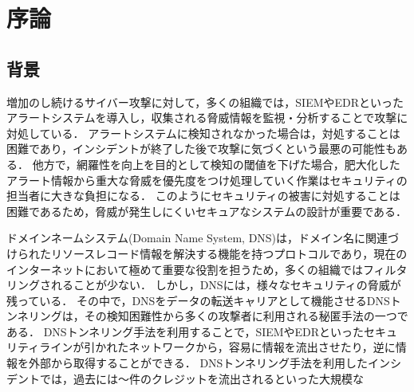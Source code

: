 \section{序論}
\subsection{背景}
増加のし続けるサイバー攻撃に対して，多くの組織では，SIEMやEDRといったアラートシステムを導入し，収集される脅威情報を監視・分析することで攻撃に対処している．
アラートシステムに検知されなかった場合は，対処することは困難であり，インシデントが終了した後で攻撃に気づくという最悪の可能性もある．
他方で，網羅性を向上を目的として検知の閾値を下げた場合，肥大化したアラート情報から重大な脅威を優先度をつけ処理していく作業はセキュリティの担当者に大きな負担になる．
このようにセキュリティの被害に対処することは困難であるため，脅威が発生しにくいセキュアなシステムの設計が重要である．

ドメインネームシステム(Domain Name System, DNS)は，ドメイン名に関連づけられたリソースレコード情報を解決する機能を持つプロトコルであり，現在のインターネットにおいて極めて重要な役割を担うため，多くの組織ではフィルタリングされることが少ない．
しかし，DNSには，様々なセキュリティの脅威が残っている．
その中で，DNSをデータの転送キャリアとして機能させるDNSトンネリングは，その検知困難性から多くの攻撃者に利用される秘匿手法の一つである．
DNSトンネリング手法を利用することで，SIEMやEDRといったセキュリティラインが引かれたネットワークから，容易に情報を流出させたり，逆に情報を外部から取得することができる．
DNSトンネリング手法を利用したインシデントでは，過去には〜件のクレジットを流出されるといった大規模な


